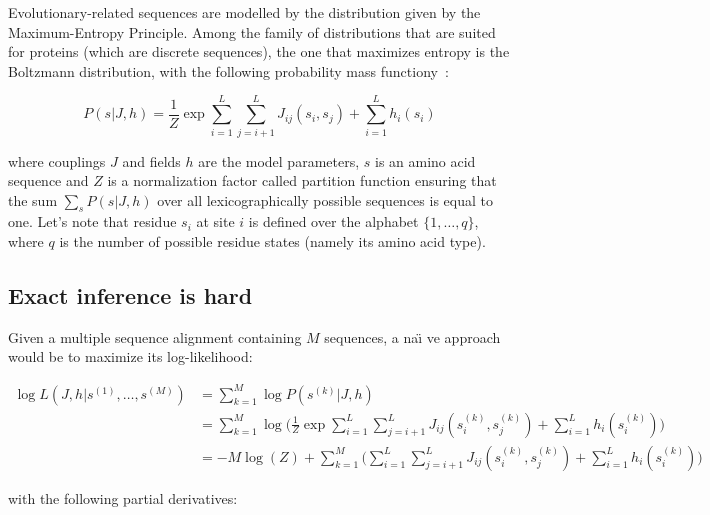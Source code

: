         Evolutionary-related sequences are modelled by the distribution
        given by the Maximum-Entropy Principle. Among the family of distributions that are suited
        for proteins (which are discrete sequences), the one that maximizes entropy is the
        Boltzmann distribution, with the following probability mass functiony~\cite{morcos2011direct}:

        \begin{equation}
            P(s \vert J, h) = \frac{1}{Z} \exp{\sum\limits_{i=1}^L \sum\limits_{j=i+1}^L J_{ij}(s_i, s_j) + \sum\limits_{i=1}^L h_i(s_i)}
        \end{equation}

        where couplings $J$ and fields $h$ are the model parameters, $s$ is an amino acid sequence and
        $Z$ is a normalization factor called partition function ensuring
        that the sum $\sum_s P(s \vert J, h)$ over all lexicographically
        possible sequences is equal to one.
        Let's note that residue $s_i$ at site $i$ is defined over the alphabet $\{ 1, \dotsc, q \}$, where $q$ is the number of possible
        residue states (namely its amino acid type).

    \subsection{Exact inference is hard}

        Given a multiple sequence alignment containing $M$ sequences, a na\"\i
        ve approach would be to maximize its log-likelihood:

        \begin{equation}
            \begin{split}
                \log{L}(J, h \vert s^{(1)}, \dotsc, s^{(M)}) & = \sum\limits_{k=1}^M \log P(s^{(k)} \vert J, h) \\
                & = \sum\limits_{k=1}^M \log \Bigg( \frac{1}{Z} \exp{\sum\limits_{i=1}^L
                    \sum\limits_{j=i+1}^L J_{ij}(s_i^{(k)}, s_j^{(k)}) + \sum\limits_{i=1}^L h_i(s_i^{(k)})} \Bigg) \\
                & = -M \log(Z) + \sum\limits_{k=1}^M \Big( \sum\limits_{i=1}^L \sum\limits_{j=i+1}^L J_{ij}(s_i^{(k)}, s_j^{(k)})
                    + \sum\limits_{i=1}^L h_i(s_i^{(k)}) \Big)
            \end{split}
        \end{equation}

        with the following partial derivatives:

